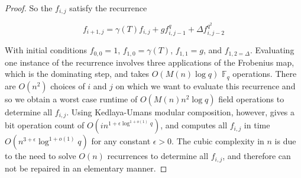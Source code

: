 \documentclass{acmart}
\theoremstyle{remark}
\numberwithin{equation}{section}
\begin{document}
\begin{proof}
\noindent So the $f_{i,j}$ satisfy the recurrence

\[ f_{i+1,j} = \gamma(T) f_{i,j} + g f_{i,j-1}^q + \Delta f_{i,j-2}^{q^2}\]


\noindent With initial conditions $f_{0,0} = 1$, $f_{1,0} = \gamma(T)$, $f_{1,1} = g$, and $f_{1,2 = \Delta}$. Evaluating one instance of the recurrence involves three applications of the Frobenius map, which is the dominating step, and takes $O(M(n) \log q)$ $\mathbb{F}_q$ operations. There are $O(n^2)$ choices of $i$ and $j$ on which we want to evaluate this recurrence and so we obtain a worst case runtime of $O(M(n)n^2\log q)$ field operations to determine all $f_{i,j}$. Using Kedlaya-Umans modular composition, however, gives a bit operation count of $O(i n^{1 + \epsilon \log^{1 + o(1)} q})$, and computes all $f_{i,j}$ in time $O(n^{3 + \epsilon} \log^{1 + o(1)} q)$ for any constant $\epsilon > 0$. The cubic complexity in $n$ is due to the need to solve $O(n)$ recurrences to determine all $f_{i,j}$, and therefore can not be repaired in an elementary manner. 

\end{proof}
\end{document}
